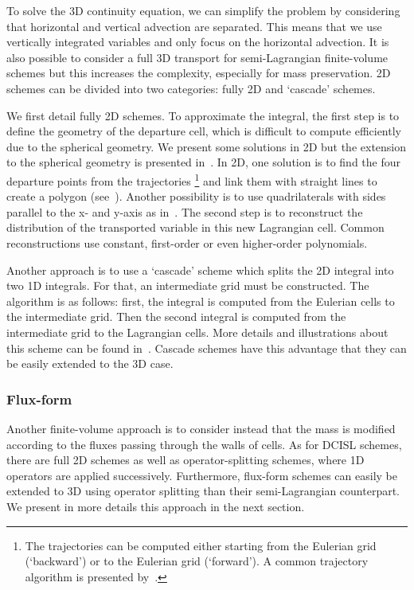 To solve the 3D continuity equation, we can simplify the problem by considering
that horizontal and vertical advection are separated. This means that we use
vertically integrated variables and only focus on the horizontal advection. It
is also possible to consider a full 3D transport for semi-Lagrangian
finite-volume schemes but this increases the complexity, especially for
mass preservation. 2D schemes can be divided into two categories: fully 2D and
`cascade' schemes.

We first detail fully 2D schemes. To approximate the integral, the first step
is to define the geometry of the departure cell, which is difficult to compute
efficiently due to the spherical geometry. We present some solutions in 2D but
the extension to the spherical geometry is presented in~\cite{Machenhauer2009}.
In 2D, one solution is to find the four departure points from the trajectories%
\footnote{The trajectories can be computed either starting from the
Eulerian grid (`backward') or to the Eulerian grid (`forward'). A common
trajectory algorithm is presented by~\cite{Staniforth1991}.} and
link them with straight lines to create a polygon (see~\cite{Rancic1992}).
Another possibility is to use quadrilaterals with sides parallel to the x- and
y-axis as in~\cite{Nair2002}.  The second step is to reconstruct the
distribution of the transported variable in this new Lagrangian cell. Common
reconstructions use constant, first-order or even higher-order polynomials.

Another approach is to use a `cascade' scheme which splits the 2D integral into
two 1D integrals. For that, an intermediate grid must be constructed. The
algorithm is as follows: first, the integral is computed from the Eulerian cells
to the intermediate grid. Then the second integral is computed from the
intermediate grid to the Lagrangian cells. More details and illustrations about
this scheme can be found in~\cite{Purser1991}. Cascade schemes have this
advantage that they can be easily extended to the 3D case.

\subsubsection{Flux-form}
Another finite-volume approach is to consider instead that the mass is modified
according to the fluxes passing through the walls of cells. As for \gls{DCISL}
schemes, there are full 2D schemes as well as operator-splitting schemes, where
1D operators are applied successively. Furthermore, flux-form schemes can easily
be extended to 3D using operator splitting than their semi-Lagrangian
counterpart. We present in more details this approach in the next section.

